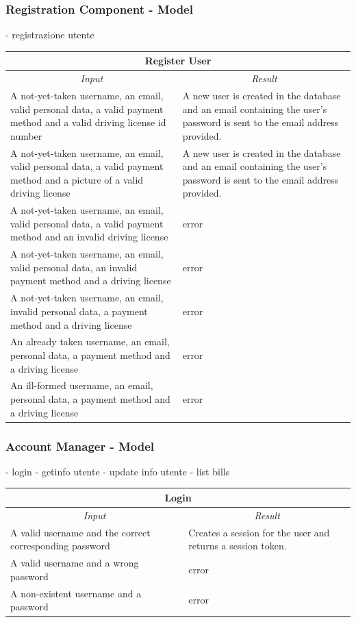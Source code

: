 \documentclass[english]{article}
\begin{document}
\subsubsection{Registration Component - Model}
- registrazione utente
\begin{center}

	\begin{tabular}{ | p{6cm} | p{6cm} | }
		\hline 
		\multicolumn{2}{|c|}{\textbf{Register User}} \\
		\hline
		\multicolumn{1}{|c|}{\textit{Input}} & \multicolumn{1}{c|}{\textit{Result}} \\
		\hline
		A not-yet-taken username, an email, valid personal data, a valid payment method and a valid driving license id number & A new user is created in the database and an email containing the user's password is sent to the email address provided. \\
		\hline
		A not-yet-taken username, an email, valid personal data, a valid payment method and a picture of a valid driving license & A new user is created in the database and an email containing the user's password is sent to the email address provided. \\
		\hline
		A not-yet-taken username, an email, valid personal data, a valid payment method and an invalid driving license & error \\
		\hline
		A not-yet-taken username, an email, valid personal data, an invalid payment method and a driving license & error \\
		\hline
		A not-yet-taken username, an email, invalid personal data, a payment method and a driving license & error \\
		\hline
		An already taken username, an email, personal data, a payment method and a driving license & error \\
		\hline
		An ill-formed username, an email, personal data, a payment method and a driving license & error \\
		\hline
	\end{tabular}
\end{center}

\subsubsection{Account Manager - Model}
- login
- getinfo utente
- update info utente
- list bills
\begin{center}

	\begin{tabular}{ | p{6cm} | p{6cm} | }
		\hline 
		\multicolumn{2}{|c|}{\textbf{Login}} \\
		\hline
		\multicolumn{1}{|c|}{\textit{Input}} & \multicolumn{1}{c|}{\textit{Result}} \\
		\hline
		A valid username and the correct corresponding password  & Creates a session for the user and returns a session token. \\
		\hline
		A valid username and a wrong password & error \\
		\hline
		A non-existent username and a password & error \\
		\hline
	\end{tabular}
\end{center}
\end{document}
